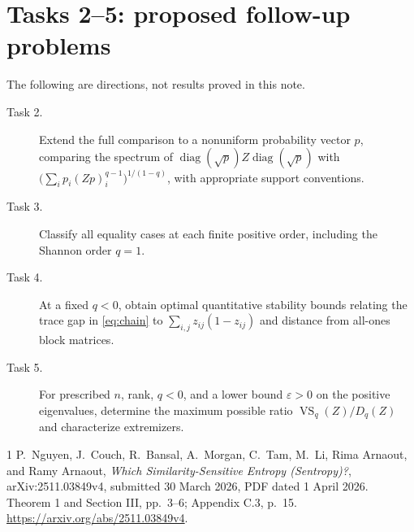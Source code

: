 \documentclass[11pt]{article}
\newcommand{\VS}{\operatorname{VS}}
\begin{document}
\section*{Tasks 2--5: proposed follow-up problems}
The following are directions, not results proved in this note.
\begin{description}
\item[Task 2.] Extend the full comparison to a nonuniform probability vector
$p$, comparing the spectrum of $\operatorname{diag}(\sqrt p)Z
\operatorname{diag}(\sqrt p)$ with
$\bigl(\sum_i p_i(Zp)_i^{q-1}\bigr)^{1/(1-q)}$, with appropriate support
conventions.
\item[Task 3.] Classify all equality cases at each finite positive order,
including the Shannon order $q=1$.
\item[Task 4.] At a fixed $q<0$, obtain optimal quantitative stability
bounds relating the trace gap in \eqref{eq:chain} to
$\sum_{i,j}z_{ij}(1-z_{ij})$ and distance from all-ones block matrices.
\item[Task 5.] For prescribed $n$, rank, $q<0$, and a lower bound
$\varepsilon>0$ on the positive eigenvalues, determine the maximum possible
ratio $\VS_q(Z)/D_q(Z)$ and characterize extremizers.
\end{description}

\begin{thebibliography}{1}
 P.~Nguyen, J.~Couch, R.~Bansal, A.~Morgan, C.~Tam, M.~Li,
Rima Arnaout, and Ramy Arnaout,
\emph{Which Similarity-Sensitive Entropy (Sentropy)?},
arXiv:2511.03849v4, submitted 30 March 2026, PDF dated 1 April 2026.
Theorem 1 and Section III, pp.~3--6; Appendix C.3, p.~15.
\url{https://arxiv.org/abs/2511.03849v4}.
\end{thebibliography}
\end{document}
